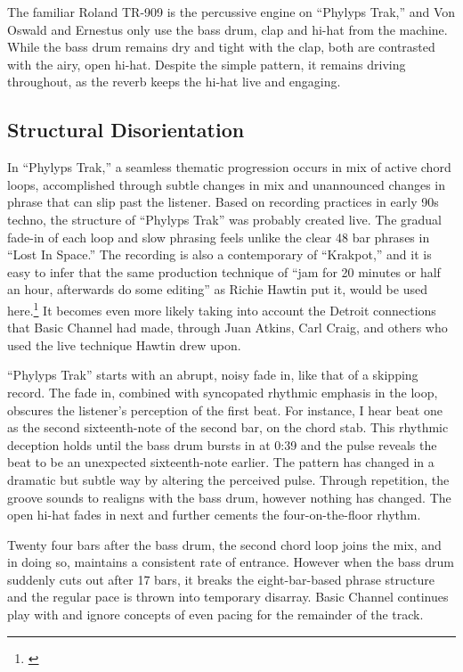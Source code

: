 \documentclass[12pt,twoside]{reedthesis}
\begin{document}
The familiar Roland TR-909 is the percussive engine on ``Phylyps Trak,'' and Von Oswald and Ernestus only use the bass drum, clap and hi-hat from the machine. While the bass drum remains dry and tight with the clap, both are contrasted with the airy, open hi-hat. Despite the simple pattern, it remains driving throughout, as the reverb keeps the hi-hat live and engaging.

\subsection{Structural Disorientation}

In ``Phylyps Trak,'' a seamless thematic progression occurs in mix of active chord loops, accomplished through subtle changes in mix and unannounced changes in phrase that can slip past the listener. Based on recording practices in early 90s techno, the structure of ``Phylyps Trak'' was probably created live. The gradual fade-in of each loop and slow phrasing feels unlike the clear 48 bar phrases in ``Lost In Space.'' The recording is also a contemporary of ``Krakpot,'' and it is easy to infer that the same production technique of ``jam for 20 minutes or half an hour, afterwards do some editing'' as Richie Hawtin put it, would be used here.\footnote{\cite{burnsRichieHawtinLecture2013}} It becomes even more likely taking into account the Detroit connections that Basic Channel had made, through Juan Atkins, Carl Craig, and others who used the live technique Hawtin drew upon.

``Phylyps Trak'' starts with an abrupt, noisy fade in, like that of a skipping record. The fade in, combined with syncopated rhythmic emphasis in the loop, obscures the listener's perception of the first beat. For instance, I hear beat one as the second sixteenth-note of the second bar, on the chord stab. This rhythmic deception holds until the bass drum bursts in at 0:39 and the pulse reveals the beat to be an unexpected sixteenth-note earlier. The pattern has changed in a dramatic but subtle way by altering the perceived pulse. Through repetition, the groove sounds to realigns with the bass drum, however nothing has changed. The open hi-hat fades in next and further cements the four-on-the-floor rhythm.

Twenty four bars after the bass drum, the second chord loop joins the mix, and in doing so, maintains a consistent rate of entrance. However when the bass drum suddenly cuts out after 17 bars, it breaks the eight-bar-based phrase structure and the regular pace is thrown into temporary disarray. Basic Channel continues play with and ignore concepts of even pacing for the remainder of the track.
\end{document}
